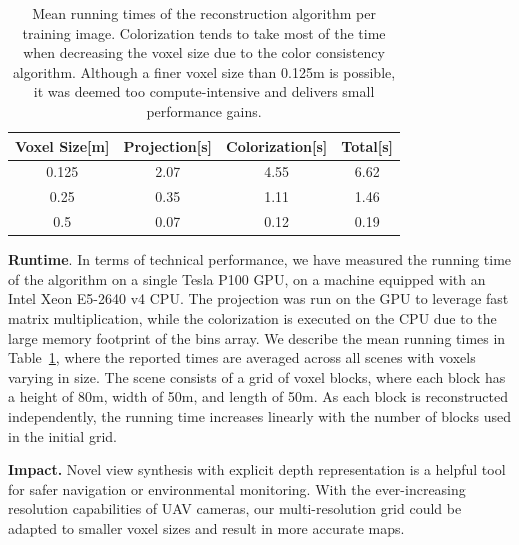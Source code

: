 \documentclass{article}
\begin{document}
\begingroup
\setlength{\tabcolsep}{4.5pt}
\begin{table}[h!]
\begin{center}
\begin{tabular}{|c|c|c|c|}
\hline
Voxel Size[m] & Projection[s] & Colorization[s]& Total[s] \\ \hline
0.125 & 2.07 & 4.55 & 6.62\\ \hline
0.25 & 0.35 & 1.11 & 1.46\\ \hline
0.5 & 0.07 & 0.12 & 0.19\\ \hline
\end{tabular}
\end{center}
\caption{\label{tab:results_time}
Mean running times of the reconstruction algorithm per training image. Colorization tends to take most of the time when decreasing the voxel size due to the color consistency algorithm. Although a finer voxel size than 0.125m is possible, it was deemed too compute-intensive and delivers small performance gains.}
\vspace{-3mm}
\end{table}
\endgroup

\noindent\textbf{Runtime}. In terms of technical performance, we have measured the running time of the algorithm on a single Tesla P100 GPU, on a machine equipped with an Intel Xeon E5-2640 v4 CPU. The projection was run on the GPU to leverage fast matrix multiplication, while the colorization is executed on the CPU due to the large memory footprint of the bins array. We describe the mean running times in Table~\ref{tab:results_time}, where the reported times are averaged across all scenes with voxels varying in size. The scene consists of a grid of voxel blocks, where each block has a height of 80m, width of 50m, and length of 50m. As each block is reconstructed independently, the running time increases linearly with the number of blocks used in the initial grid.


\noindent\textbf{Impact.} Novel view synthesis with explicit depth representation is a helpful tool for safer navigation or environmental monitoring. With the ever-increasing resolution capabilities of UAV cameras, our multi-resolution grid could be adapted to smaller voxel sizes and result in more accurate maps. %
\end{document}
